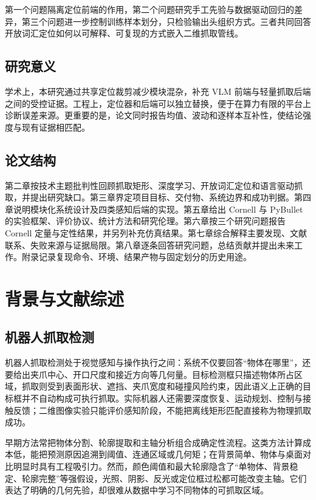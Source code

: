 \documentclass{l4proj}
\begin{document}
第一个问题隔离定位前端的作用，第二个问题研究手工先验与数据驱动回归的差异，第三个问题进一步控制训练样本划分，只检验输出头组织方式。三者共同回答开放词汇定位如何以可解释、可复现的方式嵌入二维抓取管线。

\section{研究意义}
学术上，本研究通过共享定位裁剪减少模块混杂，补充 VLM 前端与轻量抓取后端之间的受控证据。工程上，定位器和后端可以独立替换，便于在算力有限的平台上诊断误差来源。更重要的是，论文同时报告均值、波动和逐样本互补性，使结论强度与现有证据相匹配。

\section{论文结构}
第二章按技术主题批判性回顾抓取矩形、深度学习、开放词汇定位和语言驱动抓取，并提出研究缺口。第三章界定项目目标、交付物、系统边界和成功判据。第四章说明模块化系统设计及四类感知后端的实现。第五章给出 Cornell 与 PyBullet 的实验框架、评价协议、统计方法和研究伦理。第六章按三个研究问题报告 Cornell 定量与定性结果，并另列补充仿真结果。第七章综合解释主要发现、文献联系、失败来源与证据局限。第八章逐条回答研究问题，总结贡献并提出未来工作。附录记录复现命令、环境、结果产物与固定划分的历史用途。

\chapter{背景与文献综述}

\section{机器人抓取检测}
机器人抓取检测处于视觉感知与操作执行之间：系统不仅要回答“物体在哪里”，还要给出夹爪中心、开口尺度和接近方向等几何量。目标检测框只描述物体所占区域，抓取则受到表面形状、遮挡、夹爪宽度和碰撞风险约束，因此语义上正确的目标框并不自动构成可执行抓取。实际机器人还需要深度恢复、运动规划、控制与接触反馈；二维图像实验只能评价感知阶段，不能把离线矩形匹配直接称为物理抓取成功。

早期方法常把物体分割、轮廓提取和主轴分析组合成确定性流程。这类方法计算成本低，能把预测原因追溯到阈值、连通区域或几何矩；在背景简单、物体与桌面对比明显时具有工程吸引力。然而，颜色阈值和最大轮廓隐含了“单物体、背景稳定、轮廓完整”等强假设，光照、阴影、反光或定位框过松都可能改变主轴。它们表达了明确的几何先验，却很难从数据中学习不同物体的可抓取区域。
\end{document}
